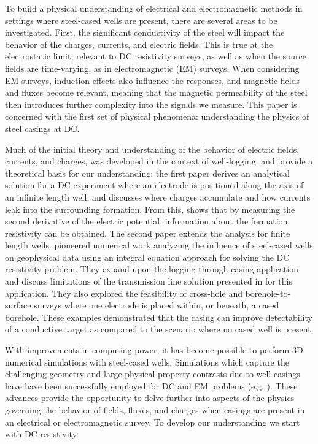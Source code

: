 \documentclass[extra,mreferee]{gji}
\begin{document}
To build a physical understanding of electrical and electromagnetic methods in settings where steel-cased wells are present, there are several areas to be investigated. First, the significant conductivity of the steel will impact the behavior of the charges, currents, and electric fields. This is true at the electrostatic limit, relevant to DC resistivity surveys, as well as when the source fields are time-varying, as in electromagnetic (EM) surveys. When considering EM surveys, induction effects also influence the responses, and magnetic fields and fluxes become relevant, meaning that the magnetic permeability of the steel then introduces further complexity into the signals we measure. This paper is concerned with the first set of physical phenomena: understanding the physics of steel casings at DC.

Much of the initial theory and understanding of the behavior of electric fields, currents, and charges, was developed in the context of well-logging. \cite{Kaufman1990} and \cite{Kaufman1993} provide a theoretical basis for our understanding; the first paper derives an analytical solution for a DC experiment where an electrode is positioned along the axis of an infinite length well, and discusses where charges accumulate and how currents leak into the surrounding formation. From this, \cite{Kaufman1990} shows that by measuring the second derivative of the electric potential, information about the formation resistivity can be obtained. The second paper extends the analysis for finite length wells. \cite{Schenkel1990, Schenkel1991, Schenkel1994} pioneered numerical work analyzing the influence of steel-cased wells on geophysical data using an integral equation approach for solving the DC resistivity problem. They expand upon the logging-through-casing application and discuss limitations of the transmission line solution presented in \cite{Kaufman1990} for this application. They also explored the feasibility of cross-hole and borehole-to-surface surveys where one electrode is placed within, or beneath, a cased borehole. These examples demonstrated that the casing can improve detectability of a conductive target as compared to the scenario where no cased well is present.

With improvements in computing power, it has become possible to perform 3D numerical simulations with steel-cased wells. Simulations which capture the challenging geometry and large physical property contrasts due to well casings have have been successfully employed for DC and EM problems (e.g. \cite{Swidinsky2013, Commer2015, Hoversten2015, Tang2015, Um2015, Weiss2016, Yang2016, Heagy2018a}). These advances provide the opportunity to delve further into aspects of the physics governing the behavior of fields, fluxes, and charges when casings are present in an electrical or electromagnetic survey. To develop our understanding we start with DC resistivity.
\end{document}
